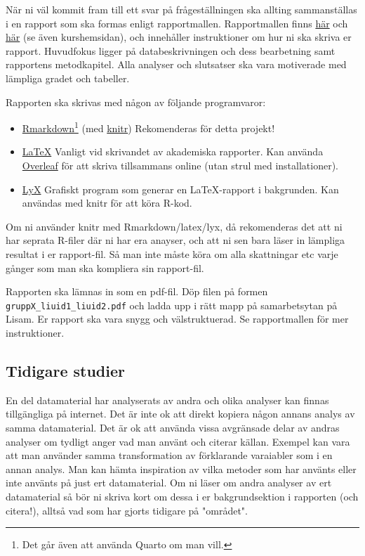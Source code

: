 \documentclass[a4paper]{article}
\begin{document}
När ni väl kommit fram till ett svar på frågeställningen ska allting sammanställas i en rapport som ska formas enligt rapportmallen. Rapportmallen finns \href{https://raw.githubusercontent.com/STIMALiU/732G57_ML/master/project/template/Rapportmall STIMA projekt.rmd}{här} och \href{https://raw.githubusercontent.com/STIMALiU/732G57_ML/master/project/template/Rapportmall-STIMA-projekt.pdf}{här} (se även kurshemsidan), och innehåller instruktioner om hur ni ska skriva er rapport. Huvudfokus ligger på databeskrivningen och dess bearbetning samt rapportens metodkapitel. Alla analyser och slutsatser ska vara motiverade med lämpliga gradet och tabeller.

Rapporten ska skrivas med någon av följande programvaror:
\begin{itemize}
    \item \href{https://rmarkdown.rstudio.com/}{Rmarkdown}\footnote{Det går även att använda Quarto om man vill.} (med \href{https://yihui.org/knitr/}{knitr}) Rekomenderas för detta projekt!
    \item \href{https://en.wikipedia.org/wiki/LaTeX}{LaTeX} Vanligt vid skrivandet av akademiska rapporter. Kan använda \href{https://www.overleaf.com}{Overleaf} för att skriva tillsammans online (utan strul med installationer).
    \item \href{https://www.lyx.org/}{LyX} Grafiskt program som generar en LaTeX-rapport i bakgrunden. Kan användas med knitr för att köra R-kod.
\end{itemize}
Om ni använder knitr med Rmarkdown/latex/lyx, då rekomenderas det att ni har seprata R-filer där ni har era anayser, och att ni sen bara läser in lämpliga resultat i er rapport-fil. Så man inte måste köra om alla skattningar etc varje gånger som man ska kompliera sin rapport-fil. 

Rapporten ska lämnas in som en pdf-fil.  Döp filen på formen \texttt{gruppX\_liuid1\_liuid2.pdf} och ladda upp i rätt mapp på samarbetsytan på Lisam. Er rapport ska vara snygg och välstruktuerad. Se rapportmallen för mer instruktioner.


\subsection*{Tidigare studier}
En del datamaterial har analyserats av andra och olika analyser kan finnas tillgängliga på internet. Det är inte ok att direkt kopiera någon annans analys av samma datamaterial. Det är ok att använda vissa avgränsade delar av andras analyser om tydligt anger vad man använt och citerar källan. Exempel kan vara att man använder samma transformation av förklarande varaiabler som i en annan analys. Man kan hämta inspiration av vilka metoder som har använts eller inte använts på just ert datamaterial. Om ni läser om andra analyser av ert datamaterial så bör ni skriva kort om dessa i er bakgrundsektion i rapporten (och citera!), alltså vad som har gjorts tidigare på "området". 
\end{document}
